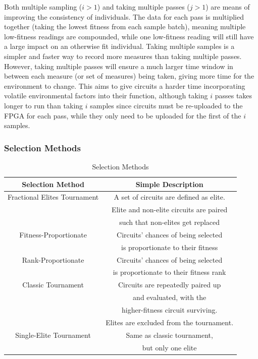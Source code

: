 \documentclass{ieeeaccess}
\begin{document}
Both multiple sampling ($i>1$) and taking multiple passes ($j>1$) are means of improving the consistency of individuals. The data for each pass is multiplied together (taking the lowest fitness from each sample batch), meaning multiple low-fitness readings are compounded, while one low-fitness reading will still have a large impact on an otherwise fit individual. Taking multiple samples is a simpler and faster way to record more measures than taking multiple passes. However, taking multiple passes will ensure a much larger time window in between each measure (or set of measures) being taken, giving more time for the environment to change. This aims to give circuits a harder time incorporating volatile environmental factors into their function, although taking $i$ passes takes longer to run than taking $i$ samples since circuits must be re-uploaded to the FPGA for each pass, while they only need to be uploaded for the first of the $i$ samples.


\subsubsection{Selection Methods}
\label{sec_selection_methods}

\begin{table}[!ht]
\caption{Selection Methods\label{tab:table_selectionmodes}}
\centering
\begin{tabular}{|c|c|}
\hline
\textbf{Selection Method} & \textbf{Simple Description}\\
\hline
Fractional Elites Tournament & A set of circuits are defined as elite. \\& Elite and non-elite circuits are paired\\& such that non-elites get replaced \\
\hline
Fitness-Proportionate & Circuits' chances of being selected\\&is proportionate to their fitness \\
\hline
Rank-Proportionate & Circuits' chances of being selected\\&is proportionate to their fitness rank \\
\hline
Classic Tournament & Circuits are repeatedly paired up\\&and evaluated, with the \\&higher-fitness circuit surviving.\\&Elites are excluded from the tournament. \\
\hline
Single-Elite Tournament & Same as classic tournament,\\&but only one elite \\
\hline
\end{tabular}
\end{table}
\end{document}
